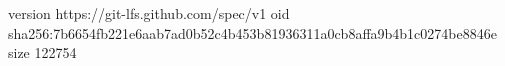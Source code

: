 version https://git-lfs.github.com/spec/v1
oid sha256:7b6654fb221e6aab7ad0b52c4b453b81936311a0cb8affa9b4b1c0274be8846e
size 122754
